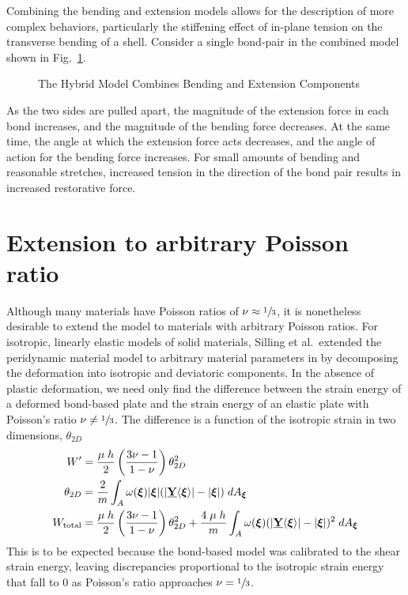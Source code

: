 Combining the bending and extension models allows for the description of more complex behaviors, particularly the stiffening effect of in-plane tension on the transverse bending of a shell.  Consider a single bond-pair in the combined model shown in Fig.~\ref{fig:hybridmodel}.
%
\begin{figure}[htbp]
  \vspace{5mm}
  \centering
  
  \caption{The Hybrid Model Combines Bending and Extension Components}
  \label{fig:hybridmodel}
\end{figure}
%
As the two sides are pulled apart, the magnitude of the extension force in each bond increases, and the magnitude of the bending force decreases.  At the same time, the angle at which the extension force acts decreases, and the angle of action for the bending force increases.  For small amounts of bending and reasonable stretches, increased tension in the direction of the bond pair results in increased restorative force.
\section{Extension to arbitrary Poisson ratio}
\label{sec:arbitrary}
Although many materials have Poisson ratios of \(\nu\approx \sfrac{1}{3}\), it is nonetheless desirable to extend the model to materials with arbitrary Poisson ratios.  For isotropic, linearly elastic models of solid materials, Silling et al.\ extended the peridynamic material model to arbitrary material parameters in \cite{silling2007peridynamic} by decomposing the deformation into isotropic and deviatoric components.  In the absence of plastic deformation, we need only find the difference between the strain energy of a deformed bond-based plate and the strain energy of an elastic plate with Poisson's ratio \(\nu \neq \sfrac{1}{3}\).  The difference is a function of the isotropic strain in two dimensions, \(\theta_{2D}\)
%
\begin{align}
    W' &= \frac{\mu\;h}{2}\left(\frac{3\nu-1}{1-\nu}\right)\theta_{2D}^2 \notag \\
    \theta_{2D} &= \frac{2}{m}\int_A \omega(\boldsymbol{\xi})|\boldsymbol{\xi}|(|\vstate{Y}{}{\boldsymbol{\xi}}|-|\boldsymbol{\xi}|)\;dA_{\boldsymbol{\xi}} \notag \\
    W_\text{total} &= \frac{\mu\;h}{2}\left(\frac{3\nu-1}{1-\nu}\right)\theta_{2D}^2 + \frac{4\;\mu\;h}{m}\int_A \omega(\boldsymbol{\xi})(|\vstate{Y}{}{\boldsymbol{\xi}}|-|\boldsymbol{\xi}|)^2\;dA_{\boldsymbol{\xi}}\notag
\end{align}
%
This is to be expected because the bond-based model was calibrated to the shear strain energy, leaving discrepancies proportional to the isotropic strain energy that fall to 0 as Poisson's ratio approaches \(\nu = \sfrac{1}{3}\).

